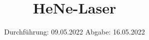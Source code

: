 

\subject{V61}
\title{HeNe-Laser}
\date{%
  Durchführung: 09.05.2022
  \hspace{3em}
  Abgabe: 16.05.2022
}



\maketitle
\thispagestyle{empty}
\tableofcontents
\newpage






\printbibliography{}


